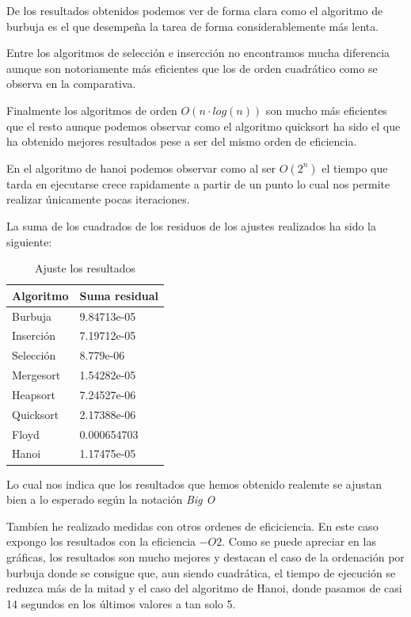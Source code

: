 \documentclass{article}
\begin{document}
\newpage

De los resultados obtenidos podemos ver de forma clara como el
algoritmo de burbuja es el que desempeña la tarea de forma
considerablemente más lenta.

Entre los algoritmos de selección e insercción no encontramos mucha
diferencia aunque son notoriamente más eficientes que los de orden
cuadrático como se observa en la comparativa.

Finalmente los algoritmos de orden $O(n\cdot log(n))$ son mucho más
eficientes que el resto aunque podemos observar como el algoritmo
quicksort ha sido el que ha obtenido mejores resultados pese a ser del
mismo orden de eficiencia.

En el algoritmo de hanoi podemos observar como al ser $O(2^n)$ el
tiempo que tarda en ejecutarse crece rapidamente a partir de un punto
lo cual nos permite realizar únicamente pocas iteraciones.

La suma de los cuadrados de los residuos de los ajustes realizados ha
sido la siguiente:

\begin{table}[H]
  \centering
  \begin{tabular}{|ll|}

    \hline
    Algoritmo & Suma residual \\ \hline
    Burbuja & 9.84713e-05 \\ \hline
    Inserción & 7.19712e-05\\ \hline
    Selección & 8.779e-06\\ \hline
    Mergesort & 1.54282e-05\\ \hline
    Heapsort & 7.24527e-06\\ \hline
    Quicksort & 2.17388e-06\\ \hline
    Floyd & 0.000654703\\ \hline
    Hanoi & 1.17475e-05\\ \hline
    
  \end{tabular}
  \caption{Ajuste los resultados}
\end{table}

Lo cual nos indica que los resultados que hemos obtenido realemte se ajustan bien a lo esperado según la notación \textit{Big  O}

Tambíen he realizado medidas con otros ordenes de eficiciencia. En
este caso expongo los resultados con la eficiencia $-O2$. Como se
puede apreciar en las gráficas, los resultados son mucho mejores y
destacan el caso de la ordenación por burbuja donde se consigue que,
aun siendo cuadrática, el tiempo de ejecución se reduzca más de la
mitad y el caso del algoritmo de Hanoi, donde pasamos de casi 14
segundos en los últimos valores a tan solo 5.
\end{document}
